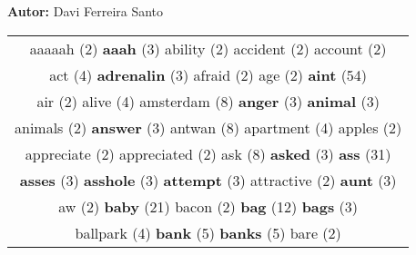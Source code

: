 \documentclass[12pt,a4paper]{article}
\begin{document}
\begin{center}
{\bf Autor:} {\sc Davi Ferreira Santo} \\
\vspace*{0.3cm}


\end{center}


\begin{center}
\begin{longtable}{|c|}
\hline
{\footnotesize \textcolor{Verde} {aaaaah}} \footnotesize{(2)} {\small \textcolor{Laranja} {\bf aaah}} \footnotesize{(3)} {\footnotesize \textcolor{Verde} {ability}} \footnotesize{(2)} {\footnotesize \textcolor{Verde} {accident}} \footnotesize{(2)} {\footnotesize \textcolor{Verde} {account}} \footnotesize{(2)}  \\ {\normalsize \textcolor{VerdeLocao} {act}} \footnotesize{(4)} {\small \textcolor{Laranja} {\bf adrenalin}} \footnotesize{(3)} {\footnotesize \textcolor{Verde} {afraid}} \footnotesize{(2)} {\footnotesize \textcolor{Verde} {age}} \footnotesize{(2)} {\Huge \textcolor{AzulEscuro} {\bf aint}} \footnotesize{(54)}  \\ {\footnotesize \textcolor{Verde} {air}} \footnotesize{(2)} {\normalsize \textcolor{VerdeLocao} {alive}} \footnotesize{(4)} {\huge \textcolor{Amarelo} {amsterdam}} \footnotesize{(8)} {\small \textcolor{Laranja} {\bf anger}} \footnotesize{(3)} {\small \textcolor{Laranja} {\bf animal}} \footnotesize{(3)}  \\ {\footnotesize \textcolor{Verde} {animals}} \footnotesize{(2)} {\small \textcolor{Laranja} {\bf answer}} \footnotesize{(3)} {\huge \textcolor{Amarelo} {antwan}} \footnotesize{(8)} {\normalsize \textcolor{VerdeLocao} {apartment}} \footnotesize{(4)} {\footnotesize \textcolor{Verde} {apples}} \footnotesize{(2)}  \\ {\footnotesize \textcolor{Verde} {appreciate}} \footnotesize{(2)} {\footnotesize \textcolor{Verde} {appreciated}} \footnotesize{(2)} {\huge \textcolor{Amarelo} {ask}} \footnotesize{(8)} {\small \textcolor{Laranja} {\bf asked}} \footnotesize{(3)} {\Huge \textcolor{AzulEscuro} {\bf ass}} \footnotesize{(31)}  \\ {\small \textcolor{Laranja} {\bf asses}} \footnotesize{(3)} {\small \textcolor{Laranja} {\bf asshole}} \footnotesize{(3)} {\small \textcolor{Laranja} {\bf attempt}} \footnotesize{(3)} {\footnotesize \textcolor{Verde} {attractive}} \footnotesize{(2)} {\small \textcolor{Laranja} {\bf aunt}} \footnotesize{(3)}  \\ {\footnotesize \textcolor{Verde} {aw}} \footnotesize{(2)} {\Huge \textcolor{AzulEscuro} {\bf baby}} \footnotesize{(21)} {\footnotesize \textcolor{Verde} {bacon}} \footnotesize{(2)} {\Huge \textcolor{AzulEscuro} {\bf bag}} \footnotesize{(12)} {\small \textcolor{Laranja} {\bf bags}} \footnotesize{(3)}  \\ {\normalsize \textcolor{VerdeLocao} {ballpark}} \footnotesize{(4)} {\large \textcolor{Roxo} {\bf bank}} \footnotesize{(5)} {\large \textcolor{Roxo} {\bf banks}} \footnotesize{(5)} {\footnotesize \textcolor{Verde} {bare}} \footnotesize{(2)} {\normalsize 
\end{longtable}
\end{center}
\end{document}
